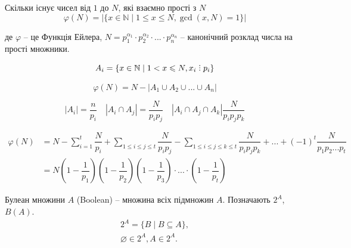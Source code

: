 \begin{example}
    Скільки існує чисел від $1$ до $N$, які взаємно прості з $N$
    \begin{equation*}
        \varphi(N) = |\{ x \in \mathbb{N} \mid 1 \leqslant x \leqslant N, \gcd(x, N) = 1 \}|
    \end{equation*}

    де $\varphi$ -- це Функція Ейлера, $N = p_1^{\alpha_1} \cdot p_2^{\alpha_2} \cdot ... \cdot p_n^{\alpha_n}$ -- канонічний розклад числа на прості множники.

    $$A_i = \{x \in \mathbb{N} \mid 1 < x \leqslant N, x_i \divby p_i \}$$

    $$\varphi(N) = N - |A_1 \cup A_2 \cup ... \cup A_n|$$

    $$|A_i| = \dfrac{n}{p_i} \quad
    |A_i \cap A_j| = \dfrac{N}{p_i p_j} \quad
    |A_i \cap A_j \cap A_k| \dfrac{N}{p_i p_j p_k}$$

    \begin{equation*}
        \begin{split}
            \varphi(N)
            &= N
            - \sum\limits_{i=1}^{t} \dfrac{N}{p_i}
            + \sum\limits_{1 \leqslant i \leqslant j \leqslant t} \dfrac{N}{p_i p_j}
            - \sum\limits_{1 \leqslant i \leqslant j \leqslant k \leqslant t} \dfrac{N}{p_i p_j p_k}
            + ...
            + (-1)^{t} \dfrac{N}{p_1 p_2 ... p_t}\\
            &= N(1 - \dfrac{1}{p_1})(1 - \dfrac{1}{p_2})(1 - \dfrac{1}{p_3}) \cdot ... \cdot (1 - \dfrac{1}{p_t})
        \end{split}
    \end{equation*}
\end{example}

\begin{definition}
    Булеан множини $A$ (Boolean) -- множина всіх підмножин $A$.
    Позначають $2^A$, $B(A)$.
    \begin{gather*}
        2^A = \{B \mid B \subseteq A\},\\
        \varnothing \in 2^A, A \in 2^A.
    \end{gather*}
\end{definition}


